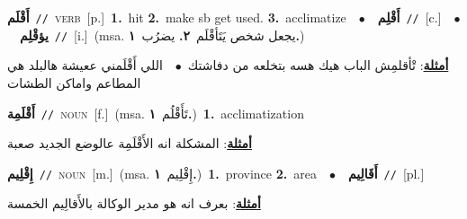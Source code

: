 \documentclass[10pt,a4paper,twoside]{article} %
\begin{document}
\begin{multicols}{2}
{\setlength\topsep{0pt}\textbf{\foreignlanguage{arabic}{أَقْلَم}}\ {\color{gray}\texttt{//}\color{black}}\ \textsc{verb}\ [p.]\ \textbf{1.}~hit  \textbf{2.}~make sb get used.  \textbf{3.}~acclimatize\ \ $\bullet$\ \ \setlength\topsep{0pt}\textbf{\foreignlanguage{arabic}{أَقْلِم}}\ {\color{gray}\texttt{//}\color{black}}\ [c.]\ \ $\bullet$\ \ \setlength\topsep{0pt}\textbf{\foreignlanguage{arabic}{يؤقْلِم}}\ {\color{gray}\texttt{//}\color{black}}\ [i.]\ \color{gray}(msa. \foreignlanguage{arabic}{يجعل شخص يَتَأقْلَم}~\foreignlanguage{arabic}{\textbf{٢.}}  \foreignlanguage{arabic}{يضرُب}~\foreignlanguage{arabic}{\textbf{١.}})\color{black}\  \begin{flushright}\color{gray}\foreignlanguage{arabic}{\textbf{\underline{\foreignlanguage{arabic}{أمثلة}}}: تْأقلمِش الباب هيك هسه بتخلعه من دفاشتك\ $\bullet$\ \  اللي أَقْلَمني ععيشة هالبلد هي المطاعم واماكن الطشات}\end{flushright}\color{black}} \vspace{2mm}

{\setlength\topsep{0pt}\textbf{\foreignlanguage{arabic}{أَقْلَمِة}}\ {\color{gray}\texttt{//}\color{black}}\ \textsc{noun}\ [f.]\ \color{gray}(msa. \foreignlanguage{arabic}{تَأَقْلُم}~\foreignlanguage{arabic}{\textbf{١.}})\color{black}\ \textbf{1.}~acclimatization\  \begin{flushright}\color{gray}\foreignlanguage{arabic}{\textbf{\underline{\foreignlanguage{arabic}{أمثلة}}}: المشكلة انه الأَقْلَمِة عالوضع الجديد صعبة}\end{flushright}\color{black}} \vspace{2mm}

{\setlength\topsep{0pt}\textbf{\foreignlanguage{arabic}{إِقْلِيم}}\ {\color{gray}\texttt{//}\color{black}}\ \textsc{noun}\ [m.]\ \color{gray}(msa. \foreignlanguage{arabic}{إِقْلِيم}~\foreignlanguage{arabic}{\textbf{١.}})\color{black}\ \textbf{1.}~province  \textbf{2.}~area\ \ $\bullet$\ \ \setlength\topsep{0pt}\textbf{\foreignlanguage{arabic}{أَقَالِيم}}\ {\color{gray}\texttt{//}\color{black}}\ [pl.]\  \begin{flushright}\color{gray}\foreignlanguage{arabic}{\textbf{\underline{\foreignlanguage{arabic}{أمثلة}}}: بعرف انه هو مدير الوكالة بالأَقالِيم الخمسة}\end{flushright}\color{black}} \vspace{2mm}


\end{multicols}
\end{document}
